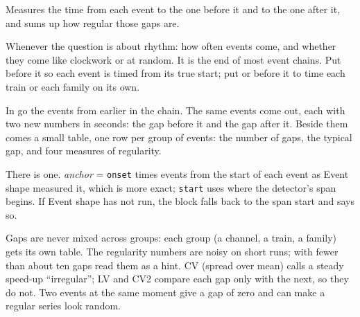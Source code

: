 Measures the time from each event to the one before it and to the one after it, and sums up
how regular those gaps are.

Whenever the question is about rhythm: how often events come, and whether they come like
clockwork or at random. It is the end of most event chains. Put
 before it so each event is timed from its true start;
put  or  before it to
time each train or each family on its own.

In go the events from earlier in the chain. The same events come out, each with two new
numbers in seconds: the gap before it and the gap after it. Beside them comes a small table,
one row per group of events: the number of gaps, the typical gap, and four measures of
regularity.

There is one. \emph{anchor} = \texttt{onset} times events from the start of each event as
Event shape measured it, which is more exact; \texttt{start} uses where the detector's span
begins. If Event shape has not run, the block falls back to the span start and says so.

Gaps are never mixed across groups: each group (a channel, a train, a family) gets its own
table. The regularity numbers are noisy on short runs; with fewer than about ten gaps read
them as a hint. CV (spread over mean) calls a steady speed-up ``irregular''; LV and CV2
compare each gap only with the next, so they do not. Two events at the same moment give a
gap of zero and can make a regular series look random.

